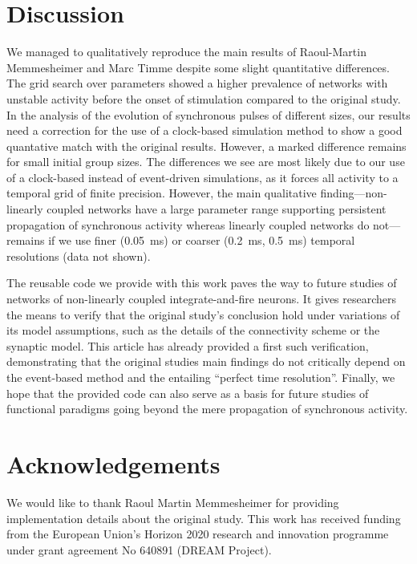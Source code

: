 \documentclass[10pt,a4paper,onecolumn]{article}
\begin{document}
\section*{Discussion}

We managed to qualitatively reproduce the main results of Raoul-Martin Memmes\-heimer and Marc Timme \cite{Memmesheimer2012} despite some slight quantitative differences. The grid search over parameters showed a higher prevalence of networks with unstable activity before the onset of stimulation compared to the original study. In the analysis of the evolution of synchronous pulses of different sizes, our results need a correction for the use of a clock-based simulation method to show a good quantative match with the original results. However, a marked difference remains for small initial group sizes. The differences we see are most likely due to our use of a clock-based instead of event-driven simulations, as it forces all activity to a temporal grid of finite precision. However, the main qualitative finding---non-linearly coupled networks have a large parameter range supporting persistent propagation of synchronous activity whereas linearly coupled networks do not---remains if we use finer (\SI{0.05}{\milli\second}) or coarser (\SI{0.2}{\milli\second}, \SI{0.5}{\milli\second}) temporal resolutions (data not shown).

The reusable code we provide with this work paves the way to future studies of networks of non-linearly coupled integrate-and-fire neurons. It gives researchers the means to verify that the original study's conclusion hold under variations of its model assumptions, such as the details of the connectivity scheme or the synaptic model. This article has already provided a first such verification, demonstrating that the original studies main findings do not critically depend on the event-based method and the entailing ``perfect time resolution''. Finally, we hope that the provided code can also serve as a basis for future studies of functional paradigms going beyond the mere propagation of synchronous activity.

\section*{Acknowledgements}
We would like to thank Raoul Martin Memmesheimer for providing implementation details about the original study. This work has received funding from the European Union’s Horizon 2020 research and innovation programme under grant agreement No 640891 (DREAM Project).
\end{document}
